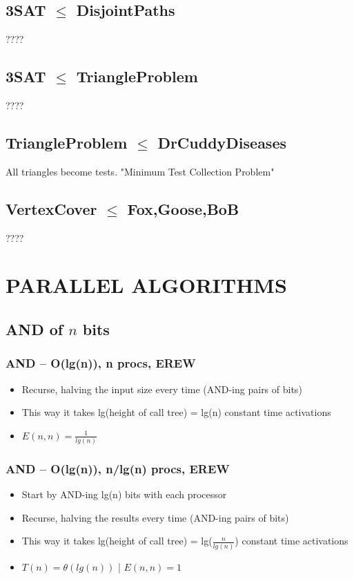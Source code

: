 \documentclass[12pt]{article}
\providecommand{\tightlist}{
    \setlength{\itemsep}{0pt}\setlength{\parskip}{0pt}
}
\providecommand{\reducible}[2]{
  \textbf{#1} $\leq$ \textbf{#2}
}
\begin{document}
\subsection{\reducible{3SAT}{DisjointPaths}}
????


\subsection{\reducible{3SAT}{TriangleProblem}}
????



\subsection{\reducible{TriangleProblem}{DrCuddyDiseases}}
All triangles become tests.
"Minimum Test Collection Problem"


\subsection{\reducible{VertexCover}{Fox,Goose,BoB}}
????





\section{PARALLEL ALGORITHMS}
\subsection{AND of $n$ bits}
\subsubsection{AND -- O(lg(n)), n procs, EREW}
\begin{itemize}\tightlist
  \item Recurse, halving the input size every time (AND-ing pairs of bits)
  \item This way it takes lg(height of call tree) = lg(n) constant time activations
  \item $E(n,n) = \frac{1}{lg(n)}$
\end{itemize}
\subsubsection{AND -- O(lg(n)), n/lg(n) procs, EREW}
\begin{itemize}\tightlist
  \item Start by AND-ing lg(n) bits with each processor
  \item Recurse, halving the results every time (AND-ing pairs of bits)
  \item This way it takes lg(height of call tree) = lg($\frac{n}{lg(n)}$) constant time activations
  \item $T(n) = \theta(lg(n))$ | $E(n,n) = 1$
\end{itemize}\tightlist
\end{document}
